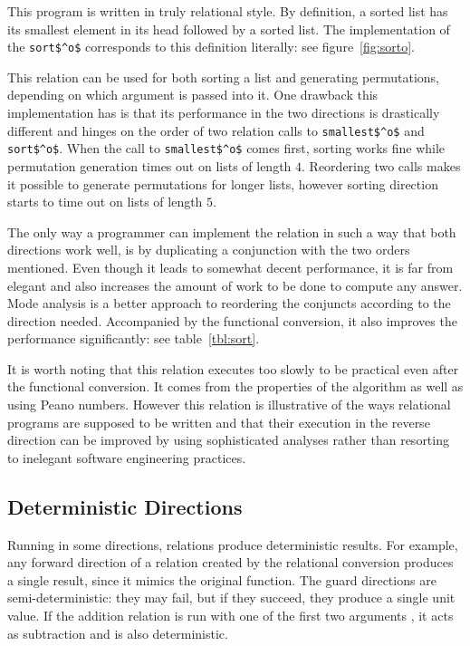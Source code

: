 


This program is written in truly relational style.
By definition, a sorted list has its smallest element in its head followed by a sorted list.
The implementation of the \lstinline{sort$^o$} corresponds to this definition literally: see figure~\ref{fig:sorto}.

This relation can be used for both sorting a list and generating permutations, depending on which argument is passed into it.
One drawback this implementation has is that its performance in the two directions is drastically different and hinges on the order of two relation calls to \lstinline{smallest$^o$} and \lstinline{sort$^o$}.
When the call to \lstinline{smallest$^o$} comes first, sorting works fine while permutation generation times out on lists of length $4$.
Reordering two calls makes it possible to generate permutations for longer lists, however sorting direction starts to time out on lists of length $5$.

The only way a programmer can implement the relation in such a way that both directions work well, is by duplicating a conjunction with the two orders mentioned.
Even though it leads to somewhat decent performance, it is far from elegant and also increases the amount of work to be done to compute any answer.
Mode analysis is a better approach to reordering the conjuncts according to the direction needed.
Accompanied by the functional conversion, it also improves the performance significantly: see table~\ref{tbl:sort}.

It is worth noting that this relation executes too slowly to be practical even after the functional conversion.
It comes from the properties of the algorithm as well as using Peano numbers.
However this relation is illustrative of the ways relational programs are supposed to be written and that their execution in the reverse direction can be improved by using sophisticated analyses rather than resorting to inelegant software engineering practices.


\subsection{Deterministic Directions}

Running in some directions, relations produce deterministic results.
For example, any forward direction of a relation created by the relational conversion produces a single result, since it mimics the original function.
The guard directions are semi-deterministic: they may fail, but if they succeed, they produce a single unit value.
If the addition relation is run with one of the first two arguments \outm, it acts as subtraction and is also deterministic.

